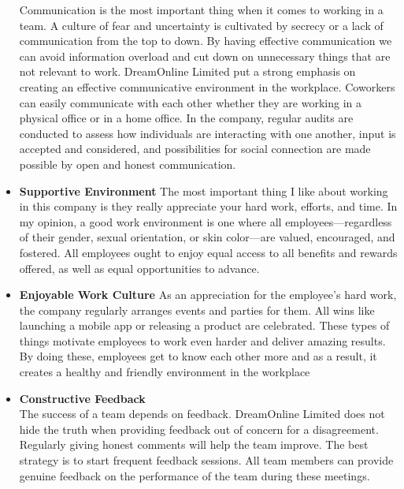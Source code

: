 \begin{flushleft}
\begin{itemize}
Communication is the most important thing when it comes to working in a team. A
culture of fear and uncertainty is cultivated by secrecy or a lack of communication from
the top to down. By having effective communication we can avoid information overload
and cut down on unnecessary things that are not relevant to work. DreamOnline Limited
put a strong emphasis on creating an effective communicative environment in the
workplace. Coworkers can easily communicate with each other whether they are working
in a physical office or in a home office. In the company, regular audits are conducted to
assess how individuals are interacting with one another, input is accepted and
considered, and possibilities for social connection are made possible by open and
honest communication.
\item \textbf{Supportive Environment}
\vspace{6pt}
The most important thing I like about working in this company is they really appreciate
your hard work, efforts, and time. In my opinion, a good work environment is one where
all employees—regardless of their gender, sexual orientation, or skin color—are valued,
encouraged, and fostered. All employees ought to enjoy equal access to all benefits and
rewards offered, as well as equal opportunities to advance.
\item \textbf{ Enjoyable Work Culture}
\vspace{6pt}
As an appreciation for the employee's hard work, the company regularly arranges events
and parties for them. All wins like launching a mobile app or releasing a product are
celebrated. These types of things motivate employees to work even harder and deliver
amazing results. By doing these, employees get to know each other more and as a
result, it creates a healthy and friendly environment in the workplace
\item \textbf{Constructive Feedback}\\
\vspace{6pt}
The success of a team depends on feedback. DreamOnline Limited does not hide the
truth when providing feedback out of concern for a disagreement. Regularly giving
honest comments will help the team improve. The best strategy is to start frequent
feedback sessions. All team members can provide genuine feedback on the
performance of the team during these meetings.
\end{itemize}

\end{flushleft}

